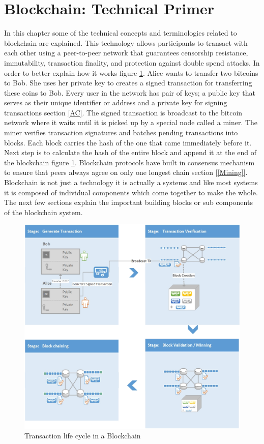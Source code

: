 \section{Blockchain: Technical Primer} \label{Blockchain}
In this chapter some of the technical concepts and terminologies related to blockchain are explained. This technology allows participants to transact with each other using a peer-to-peer network that guarantees censorship resistance, immutability, transaction finality, and protection against double spend attacks. In order to better explain how it works figure \ref{fig:bc-workflow}. Alice wants to transfer two bitcoins to Bob. She uses her private key to creates a signed transaction for transferring these coins to Bob. Every user in the network has pair of keys; a public key that serves as their unique identifier or address and a private key for signing transactions section \ref{AC}. The signed transaction is broadcast to the bitcoin network where it waits until it is picked up by a special node called a miner. The miner verifies transaction signatures and batches pending transactions into blocks. Each block carries the hash of the one that came immediately before it. Next step is to calculate the hash of the entire block and append it at the end of the blockchain figure \ref{fig:bc-workflow}. Blockchain protocols have built in consensus mechanism to ensure that peers always agree on only one longest chain section [\ref{Mining}]. Blockchain is not just a technology it is actually a systems and like most systems it is composed of individual components which come together to make the whole. The next few sections explain the important building blocks or sub components of the blockchain system.

\begin{figure}[h]
	\centering
    \includegraphics[width=140mm,scale=1]{figs/bc-workflow}
	\caption{Transaction life cycle in a Blockchain}
	\label{fig:bc-workflow}
\end{figure}
\clearpage

